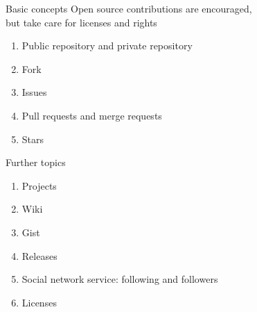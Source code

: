 \documentclass[english, nochinese]{pkuslide}
\begin{document}
\begin{frame}
\sectionpage
\end{frame}

\begin{frame}{Basic concepts}
Open source contributions are encouraged, \\
but take care for licenses and rights
\begin{enumerate}
\item Public repository and private repository
\item Fork
\item Issues
\item Pull requests and merge requests
\item Stars
\end{enumerate}
\end{frame}

\begin{frame}{Further topics}
\begin{enumerate}
\item Projects
\item Wiki
\item Gist
\item Releases
\item Social network service: following and followers
\item Licenses
\end{enumerate}
\end{frame}

	
\end{document}

